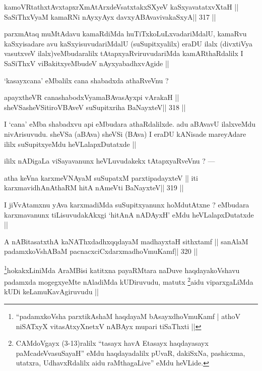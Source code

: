 \begin{shl}
kamoVRtathxtAvxtapxrXmAtArxdeVsatxtakxSXyeV kaSxyavatatxvXtaH ||
SaSiThxVyaM kamaRNi nAyxyAyx davxyABAvavivakaSxyA\hfill || 317 ||
\end{shl}

\begin{artha}
parxmAtaq muMtAdavu kamaRdiMda huTiTxkoLuLxvadariMdalU, kamaRvu kaSxyisadare avu kaSxyisuvudariMdalU (suSupitxyalilx) eraDU ilalx (divxtiVya vasutxveV ilalx)veMbudaralilx tAtapxyaRviruvudariMda kamARthaRdalilx I SaSiThxV viBakitxyeMbudeV nAyxyabadhxvAgide ||
\end{artha}

\begin{artha}
`kasayxcana' eMbalilx cana shabadxda athaRveVnu ?
\end{artha}

\begin{shl}
apayxtheVR canashabodxV\s yamaBAvasAyxpi vArakaH ||
sheVSasheVSitiroVBAveV suSupitxriha BaNayxteV\hfill || 318 ||
\end{shl}

\begin{artha}
I `cana' eMba shabadxvu api eMbudara athaRdalilxde. adu aBAvavU ilalxveMdu nivArisuvudu. sheVSa (aBAva) sheVSi (BAva) I eraDU kANisade mareyAdare ililx suSupitxyeMdu heVLalapxDutatxde ||
\end{artha}

\begin{artha}
ililx nADigaLa viSayavanunx heVLuvudakekx tAtapxyaRveVnu ? ---
\end{artha}

\begin{shl}
atha keVna karxmeVNAyaM suSupatxM parxtipadayxteV ||
iti karxmavidhAnAthaRM hitA nAmeVti BaNayxteV\hfill || 319 ||
\end{shl}

\begin{artha}
I jiVvAtamxnu yAva karxmadiMda suSupitxyanunx hoMdutAtxne ? eMbudara karxmavanunx tiLisuvudakAkxgi `hitAnA nADAyxH' eMdu heVLalapxDutatxde ||
\end{artha}

\begin{shl}
A nABitasatxthA kaNAThxdadhxqqdayaM madhayxtaH sithxtamf ||
sanAlaM padamxkoVshABaM pacnacxciCxdarxmadhoVmuKamf\hfill || 320 ||
\end{shl}

\begin{artha}
\footnote[1]{``padamxkoVsha parxtikAshaM haqdayaM bAsayxdhoVmuKamf | athoV niSATxyX vitasAtxyXnetxV nABAyx mupari tiSaThxti ||}hokakxLiniMda AraMBisi katitxna payaRMtara naDuve haqdayakoVshavu padamxda mogegxyeMte nAladiMda kUDiruvudu, matutx \footnote[2]{CAMdoVgayx (3-13)ralilx ``tasayx havA Etasayx haqdayasayx paMcadeVvasuSayaH'' eMdu haqdayadalilx pUvaR, dakiSxNa, pashicxma, utatxra, UdhavxRdalilx aidu raMthagaLive'' eMdu heVLide.}aidu viparxgaLiMda kUDi keLamuKavAgiruvudu ||
\end{artha}

